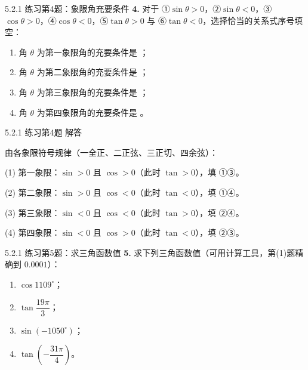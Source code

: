 \documentclass[10pt,aspectratio=169,serif]{beamer}
\begin{document}
\begin{frame}[t]{5.2.1 练习第4题：象限角充要条件}
\textbf{4.} 对于 ①$\sin\theta>0$，②$\sin\theta<0$，③$\cos\theta>0$，④$\cos\theta<0$，⑤$\tan\theta>0$ 与 ⑥$\tan\theta<0$，选择恰当的关系式序号填空：
\begin{enumerate}
  \item 角 $\theta$ 为第一象限角的充要条件是 \underline{\hspace{2cm}}；
  \item 角 $\theta$ 为第二象限角的充要条件是 \underline{\hspace{2cm}}；
  \item 角 $\theta$ 为第三象限角的充要条件是 \underline{\hspace{2cm}}；
  \item 角 $\theta$ 为第四象限角的充要条件是 \underline{\hspace{2cm}}。
\end{enumerate}
\end{frame}

\begin{frame}[t]{5.2.1 练习第4题 解答}
\begin{tcolorbox}[colback=orange!10,colframe=orange,title=\textbf{解}]
由各象限符号规律（一全正、二正弦、三正切、四余弦）：

\vspace{0.5em}
(1) 第一象限：$\sin>0$ 且 $\cos>0$（此时 $\tan>0$），填 \alert{①③}。

(2) 第二象限：$\sin>0$ 且 $\cos<0$（此时 $\tan<0$），填 \alert{①④}。

(3) 第三象限：$\sin<0$ 且 $\cos<0$（此时 $\tan>0$），填 \alert{②④}。

(4) 第四象限：$\sin<0$ 且 $\cos>0$（此时 $\tan<0$），填 \alert{②③}。
\end{tcolorbox}
\end{frame}

\begin{frame}[t]{5.2.1 练习第5题：求三角函数值}
\textbf{5.} 求下列三角函数值（可用计算工具，第(1)题精确到 $0.0001$）：
\begin{enumerate}
  \item $\cos 1109^\circ$；
  \item $\tan\dfrac{19\pi}{3}$；
  \item $\sin(-1050^\circ)$；
  \item $\tan\left(-\dfrac{31\pi}{4}\right)$。
\end{enumerate}
\end{frame}
\end{document}

